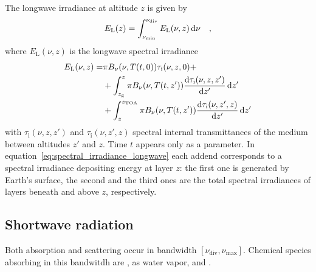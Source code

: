 \documentclass[a4paper,10pt,twocolumn,\classoptions]{article}
\newcommand{\zTOA}{z_\text{TOA}}
\begin{document}
The longwave irradiance at altitude $z$ is given by
\begin{equation}
  \label{eq:irradiance_longwave}
  E_\text{L}(z) = \int_{\nu_\text{min}}^{\nu_\text{div}} E_\text{L}(\nu, z) \odif{\nu}
  \quad ,
\end{equation}
where $E_\text{L}(\nu, z)$ is the longwave spectral irradiance
\begin{equation}
  \label{eq:spectral_irradiance_longwave}
  \begin{split}
    E_\text{L}(\nu, z) = & \pi B_\nu(\nu, T(t, 0)) \tau_\text{i}(\nu, z, 0) + \\
    & + \int_{z_\text{g}}^{z} \pi B_\nu(\nu, T(t, z')) \odv{\tau_\text{i}(\nu, z, z')}{z'} \odif{z'} \\
    & + \int_{z}^{\zTOA} \pi B_\nu(\nu, T(t, z')) \odv{\tau_\text{i}(\nu, z', z)}{z'} \odif{z'}
  \end{split}
\end{equation}
with $\tau_\text{i}(\nu, z, z')$ and $\tau_\text{i}(\nu, z', z)$ spectral internal transmittances of the medium between altitudes $z'$ and $z$. Time $t$ appears only as a parameter.
In equation~\eqref{eq:spectral_irradiance_longwave} each addend corresponds to a spectral irradiance depositing energy at layer $z$: the first one is generated by Earth's surface, the second and the third ones are the total spectral irradiances of layers beneath and above $z$, respectively.




\subsection{Shortwave radiation}
\label{sec:Shortwave radiation}
Both absorption and scattering occur in bandwidth $[\nu_\text{div}, \nu_\text{max}]$.
Chemical species absorbing in this bandwitdh are ,  as water vapor,  and .
\end{document}
